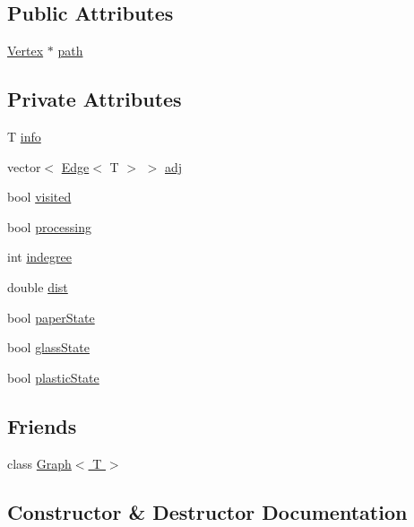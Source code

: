 \subsection*{Public Attributes}
\begin{DoxyCompactItemize}
\item 
\hyperlink{classVertex}{Vertex} $\ast$ \hyperlink{classVertex_abd40febd917aa25add6bd42237c8463a}{path}
\end{DoxyCompactItemize}
\subsection*{Private Attributes}
\begin{DoxyCompactItemize}
\item 
T \hyperlink{classVertex_a415d7811eef6cdd992f0dca1f35a49cd}{info}
\item 
vector$<$ \hyperlink{classEdge}{Edge}$<$ T $>$ $>$ \hyperlink{classVertex_a5d9dfdd2caee11e300ff5142799345a1}{adj}
\item 
bool \hyperlink{classVertex_a187a2fe4ff50261cf3c15b8cda7dfc56}{visited}
\item 
bool \hyperlink{classVertex_ae575d4b9a6b1ada3f9626c458c060f54}{processing}
\item 
int \hyperlink{classVertex_ab29ac1b694fc673ba26cfc6d3e9bda13}{indegree}
\item 
double \hyperlink{classVertex_a08a2b813e77f97aa8b6c1d252e5417f7}{dist}
\item 
bool \hyperlink{classVertex_a4e60ef51bac5518a768c94cbe5e3a3a1}{paper\+State}
\item 
bool \hyperlink{classVertex_ab35cb5fe44be9ef7385a2714a4b45e11}{glass\+State}
\item 
bool \hyperlink{classVertex_a2eb25055ba8814fbea5d3f782b464a3c}{plastic\+State}
\end{DoxyCompactItemize}
\subsection*{Friends}
\begin{DoxyCompactItemize}
\item 
class \hyperlink{classVertex_aefa9b76cd57411c5354e5620dc2d84dd}{Graph$<$ T $>$}
\end{DoxyCompactItemize}


\subsection{Constructor \& Destructor Documentation}

